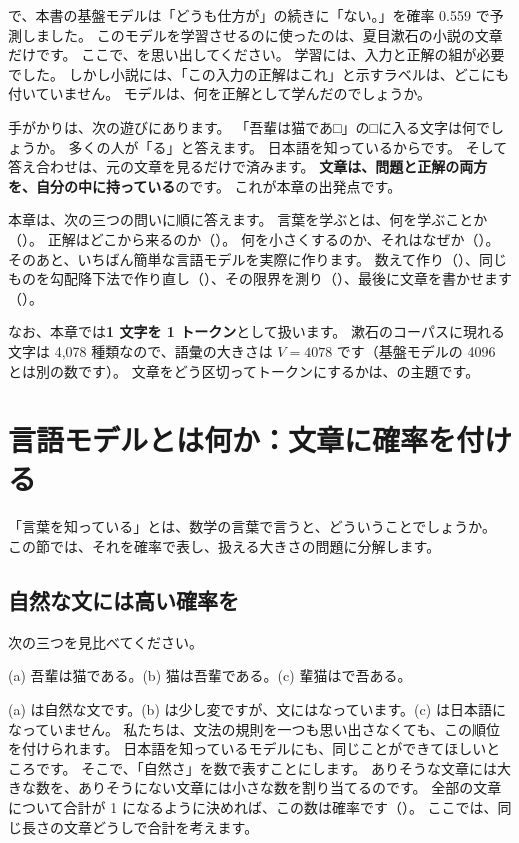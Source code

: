 で、本書の基盤モデルは「どうも仕方が」の続きに「ない。」を確率 0.559 で予測しました。
このモデルを学習させるのに使ったのは、夏目漱石の小説の文章だけです。
ここで、を思い出してください。
学習には、入力と正解の組が必要でした。
しかし小説には、「この入力の正解はこれ」と示すラベルは、どこにも付いていません。
モデルは、何を正解として学んだのでしょうか。

手がかりは、次の遊びにあります。
「吾輩は猫であ□」の□に入る文字は何でしょうか。
多くの人が「る」と答えます。
日本語を知っているからです。
そして答え合わせは、元の文章を見るだけで済みます。
\textbf{文章は、問題と正解の両方を、自分の中に持っている}のです。
これが本章の出発点です。

本章は、次の三つの問いに順に答えます。
言葉を学ぶとは、何を学ぶことか（）。
正解はどこから来るのか（）。
何を小さくするのか、それはなぜか（）。
そのあと、いちばん簡単な言語モデルを実際に作ります。
数えて作り（）、同じものを勾配降下法で作り直し（）、その限界を測り（）、最後に文章を書かせます（）。

なお、本章では\textbf{1 文字を 1 トークン}として扱います。
漱石のコーパスに現れる文字は 4,078 種類なので、語彙の大きさは $V=4078$ です（基盤モデルの 4096 とは別の数です）。
文章をどう区切ってトークンにするかは、の主題です。

\section{言語モデルとは何か：文章に確率を付ける}\label{sec:lm-definition}

「言葉を知っている」とは、数学の言葉で言うと、どういうことでしょうか。
この節では、それを確率で表し、扱える大きさの問題に分解します。

\subsection*{自然な文には高い確率を}

次の三つを見比べてください。
\begin{center}
(a) 吾輩は猫である。\qquad (b) 猫は吾輩である。\qquad (c) 輩猫はで吾ある。
\end{center}
(a) は自然な文です。(b) は少し変ですが、文にはなっています。(c) は日本語になっていません。
私たちは、文法の規則を一つも思い出さなくても、この順位を付けられます。
日本語を知っているモデルにも、同じことができてほしいところです。
そこで、「自然さ」を数で表すことにします。
ありそうな文章には大きな数を、ありそうにない文章には小さな数を割り当てるのです。
全部の文章について合計が 1 になるように決めれば、この数は確率です（）。
ここでは、同じ長さの文章どうしで合計を考えます。

